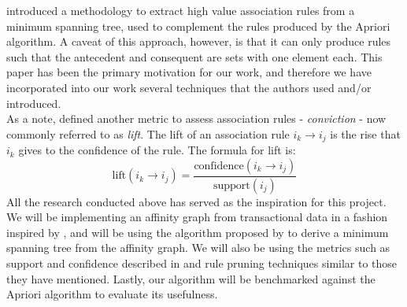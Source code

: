  introduced a methodology to extract high value association rules from a minimum spanning tree, used to complement the rules produced by the Apriori algorithm. A caveat of this approach, however, is that it can only produce rules such that the antecedent and consequent are sets with one element each. This paper has been the primary motivation for our work, and therefore we have incorporated into our work several techniques that the authors used and/or introduced.
\\As a note,  defined another metric to assess association rules - \textit{conviction} - now commonly referred to as \textit{lift}. The lift of an association rule $i_k \rightarrow i_j$ is the rise that $i_k$ gives to the confidence of the rule. The formula for lift is:
\[
\text{lift}(i_k \rightarrow i_j) = \frac{\text{confidence}(i_k \rightarrow i_j)}{\text{support}(i_j)}
\] 
All the research conducted above has served as the inspiration for this project. We will be implementing an affinity graph from transactional data in a fashion inspired by , and will be using the algorithm proposed by  to derive a minimum spanning tree from the affinity graph. We will also be using the metrics such as support and confidence described in  and rule pruning techniques similar to those they have mentioned. Lastly, our algorithm will be benchmarked against the Apriori algorithm  to evaluate its usefulness.
